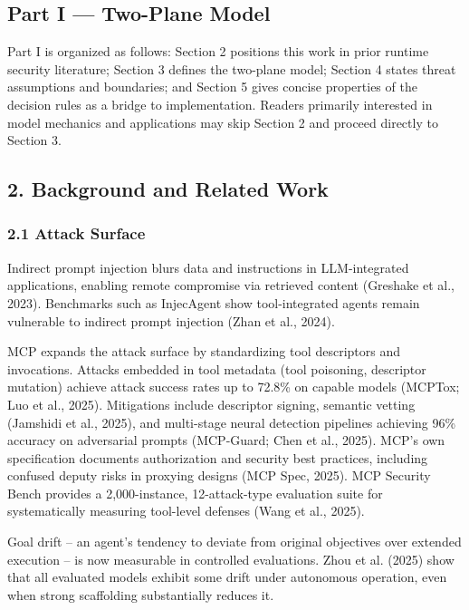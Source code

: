 \documentclass[
]{article}
\begin{document}
\subsection{Part I --- Two-Plane Model}\label{part-i-two-plane-model}

Part I is organized as follows: Section 2 positions this work in prior
runtime security literature; Section 3 defines the two-plane model;
Section 4 states threat assumptions and boundaries; and Section 5 gives
concise properties of the decision rules as a bridge to implementation.
Readers primarily interested in model mechanics and applications may
skip Section 2 and proceed directly to Section 3.

\subsection{2. Background and Related
Work}\label{background-and-related-work}

\subsubsection{2.1 Attack Surface}\label{attack-surface}

Indirect prompt injection blurs data and instructions in LLM-integrated
applications, enabling remote compromise via retrieved content (Greshake
et al., 2023). Benchmarks such as InjecAgent show tool-integrated agents
remain vulnerable to indirect prompt injection (Zhan et al., 2024).

MCP expands the attack surface by standardizing tool descriptors and
invocations. Attacks embedded in tool metadata (tool poisoning,
descriptor mutation) achieve attack success rates up to 72.8\% on
capable models (MCPTox; Luo et al., 2025). Mitigations include
descriptor signing, semantic vetting (Jamshidi et al., 2025), and
multi-stage neural detection pipelines achieving 96\% accuracy on
adversarial prompts (MCP-Guard; Chen et al., 2025). MCP's own
specification documents authorization and security best practices,
including confused deputy risks in proxying designs (MCP Spec, 2025).
MCP Security Bench provides a 2,000-instance, 12-attack-type evaluation
suite for systematically measuring tool-level defenses (Wang et al.,
2025).

Goal drift -- an agent's tendency to deviate from original objectives
over extended execution -- is now measurable in controlled evaluations.
Zhou et al. (2025) show that all evaluated models exhibit some drift
under autonomous operation, even when strong scaffolding substantially
reduces it.
\end{document}
